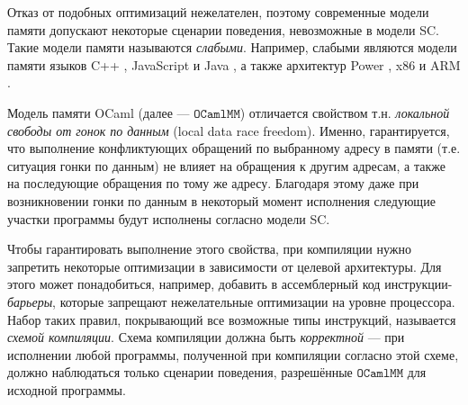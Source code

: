 \documentclass[14pt]{matmex-diploma-custom}
\newcommand{\OMM}{\mathtt{OCaml}\allowbreak \mathtt{MM}}
\newcommand{\defn}[1]{\textit{#1}}
\begin{document}
Отказ от подобных оптимизаций нежелателен, поэтому современные модели памяти допускают некоторые сценарии поведения, невозможные в модели SC. Такие модели памяти называются \defn{слабыми}. Например, слабыми являются модели памяти языков C++ \cite{cpp}, JavaScript \cite{js-mm} и Java \cite{jmm}, а также архитектур Power \cite{power}, x86 \cite{x86} и ARM \cite{arm}.



Модель памяти OCaml \cite{omm} (далее --- $\OMM$) отличается свойством т.н.  \textit{локальной свободы от гонок по данным} (local data race freedom). Именно, гарантируется, что выполнение конфликтующих обращений по выбранному адресу в памяти (т.е. ситуация гонки по данным) не влияет на обращения к другим адресам, а также на последующие обращения по тому же адресу. Благодаря этому даже при возникновении гонки по данным в некоторый момент исполнения следующие участки программы будут исполнены согласно модели SC. 

Чтобы гарантировать выполнение этого свойства, при компиляции нужно запретить некоторые оптимизации в зависимости от целевой архитектуры.
Для этого может понадобиться, например, добавить в ассемблерный код инструкции-\defn{барьеры}, которые запрещают нежелательные оптимизации на уровне процессора. 
Набор таких правил, покрывающий все возможные типы инструкций, называется \defn{схемой компиляции}. Схема компиляции должна быть \defn{корректной} --- при исполнении любой программы, полученной при компиляции согласно этой схеме, должно наблюдаться только сценарии поведения, разрешённые $\OMM$ для исходной программы.
\end{document}
